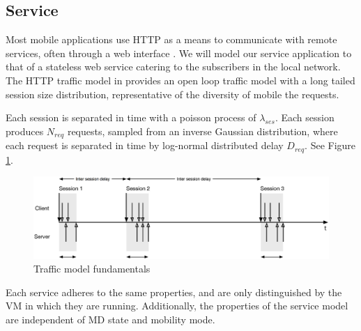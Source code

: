 \subsection{Service}
Most mobile applications use HTTP as a means to communicate with remote services, often through a web interface \cite{maier2010first,falaki2010first}. We will model our service application to that of a stateless web service catering to the subscribers in the local network. The HTTP traffic model in \cite{reyes1999page} provides an open loop traffic model with a long tailed session size distribution, representative of the diversity of mobile the requests. 

Each session is separated in time with a poisson process of $\lambda_{ses}$. Each session produces $N_{req}$ requests, sampled from an inverse Gaussian distribution, where each request is separated in time by log-normal distributed delay $D_{req}$. See Figure \ref{fig:traffic_model}.

\begin{figure}[tb]
	\centering
	\includegraphics{fig_traffic_model.eps} 
	\caption{Traffic model fundamentals}
	\label{fig:traffic_model}
\end{figure}

Each service adheres to the same properties, and are only distinguished by the \ac{VM} in which they are running. Additionally, the properties of the service model are independent of \ac{MD} state and mobility mode.

